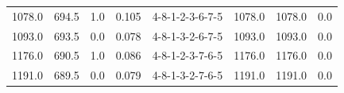 \begin{tabular}{rrrrlrrr}
 1078.0 &  694.5 &            1.0 &              0.105 &  4-8-1-2-3-6-7-5 &        1078.0 &          1078.0 &       0.0 \\
 1093.0 &  693.5 &            0.0 &              0.078 &  4-8-1-3-2-6-7-5 &        1093.0 &          1093.0 &       0.0 \\
 1176.0 &  690.5 &            1.0 &              0.086 &  4-8-1-2-3-7-6-5 &        1176.0 &          1176.0 &       0.0 \\
 1191.0 &  689.5 &            0.0 &              0.079 &  4-8-1-3-2-7-6-5 &        1191.0 &          1191.0 &       0.0 \\
\bottomrule
\end{tabular}
